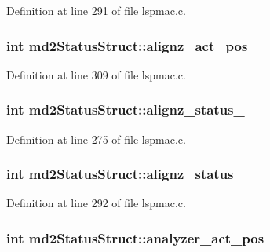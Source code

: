 Definition at line 291 of file lspmac.\-c.

\hypertarget{structmd2StatusStruct_a480f892fe91b05b2980fb00064807e2b}{
\subsubsection[{alignz\-\_\-act\-\_\-pos}]{\setlength{\rightskip}{0pt plus 5cm}int md2\-Status\-Struct\-::alignz\-\_\-act\-\_\-pos}}\label{structmd2StatusStruct_a480f892fe91b05b2980fb00064807e2b}


Definition at line 309 of file lspmac.\-c.

\hypertarget{structmd2StatusStruct_aadbfac5709de57e449a37e2937d6ade7}{
\subsubsection[{alignz\-\_\-status\-\_\-1}]{\setlength{\rightskip}{0pt plus 5cm}int md2\-Status\-Struct\-::alignz\-\_\-status\-\_}}\label{structmd2StatusStruct_aadbfac5709de57e449a37e2937d6ade7}


Definition at line 275 of file lspmac.\-c.

\hypertarget{structmd2StatusStruct_ac378da16eeaab2bc47f3f8f88f7411ed}{
\subsubsection[{alignz\-\_\-status\-\_\-2}]{\setlength{\rightskip}{0pt plus 5cm}int md2\-Status\-Struct\-::alignz\-\_\-status\-\_}}\label{structmd2StatusStruct_ac378da16eeaab2bc47f3f8f88f7411ed}


Definition at line 292 of file lspmac.\-c.

\hypertarget{structmd2StatusStruct_a49d1151b0e819646587be0ca9c9d612a}{
\subsubsection[{analyzer\-\_\-act\-\_\-pos}]{\setlength{\rightskip}{0pt plus 5cm}int md2\-Status\-Struct\-::analyzer\-\_\-act\-\_\-pos}}\label{structmd2StatusStruct_a49d1151b0e819646587be0ca9c9d612a}


